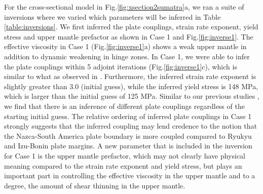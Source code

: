 \documentclass[12pt]{article}
\begin{document}
For the cross-sectional model in Fig.\ref{fig:xsection2sumatra}a, we ran a suite of inversions where we varied which parameters will be inferred in Table \ref{table:inversions}.  We first inferred the plate couplings, strain rate exponent, yield stress and upper mantle prefactor as shown in Case 1 and Fig.\ref{fig:inverse1}. The effective viscosity in Case 1 (Fig.\ref{fig:inverse1}a) shows a weak upper mantle in addition to dynamic weakening in hinge zones.  In Case 1, we were able to infer the plate couplings within 5 adjoint iterations (Fig.\ref{fig:inverse1}c), which is similar to what as observed in \citep{ratnaswamy2015adjoint}. Furthermore, the inferred strain rate exponent is slightly greater than 3.0 (initial guess), while the inferred yield stress is 148 MPa, which is larger than the initial guess of 125 MPa. Similar to our previous studies \citep{ratnaswamy2015adjoint}, we find that there is an inference of different plate couplings regardless of the starting initial guess. The relative ordering of inferred plate couplings in Case 1 strongly suggests that the inferred coupling may lend credence to the notion that the Nazca-South America plate boundary is more coupled compared to Ryukyu and Izu-Bonin plate margins. A new parameter that is included in the inversion for Case 1 is the upper mantle prefactor,  which may not clearly have physical meaning compared to the strain rate exponent and yield stress, but plays an important part in controlling the effective viscosity in the upper mantle and to a degree, the amount of shear thinning in the upper mantle. 
\end{document}
